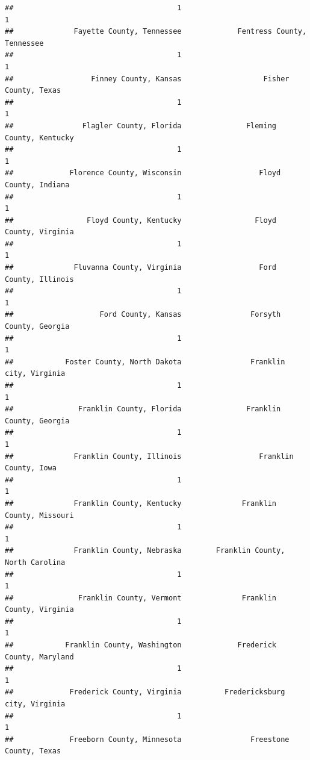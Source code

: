 \documentclass[
]{article}
\begin{document}
\begin{verbatim}
##                                      1                                      1 
##              Fayette County, Tennessee             Fentress County, Tennessee 
##                                      1                                      1 
##                  Finney County, Kansas                   Fisher County, Texas 
##                                      1                                      1 
##                Flagler County, Florida               Fleming County, Kentucky 
##                                      1                                      1 
##             Florence County, Wisconsin                  Floyd County, Indiana 
##                                      1                                      1 
##                 Floyd County, Kentucky                 Floyd County, Virginia 
##                                      1                                      1 
##              Fluvanna County, Virginia                  Ford County, Illinois 
##                                      1                                      1 
##                    Ford County, Kansas                Forsyth County, Georgia 
##                                      1                                      1 
##            Foster County, North Dakota                Franklin city, Virginia 
##                                      1                                      1 
##               Franklin County, Florida               Franklin County, Georgia 
##                                      1                                      1 
##              Franklin County, Illinois                  Franklin County, Iowa 
##                                      1                                      1 
##              Franklin County, Kentucky              Franklin County, Missouri 
##                                      1                                      1 
##              Franklin County, Nebraska        Franklin County, North Carolina 
##                                      1                                      1 
##               Franklin County, Vermont              Franklin County, Virginia 
##                                      1                                      1 
##            Franklin County, Washington             Frederick County, Maryland 
##                                      1                                      1 
##             Frederick County, Virginia          Fredericksburg city, Virginia 
##                                      1                                      1 
##             Freeborn County, Minnesota                Freestone County, Texas 

\end{verbatim}
\end{document}

